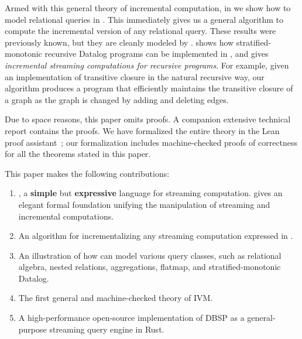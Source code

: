 Armed with this general theory of incremental computation, in
 we show how to model relational queries in
\dbsp.  This immediately gives us a general algorithm to compute the
incremental version of any relational query.  These results were
previously known, but they are cleanly modeled by \dbsp.
 shows how stratified-monotonic recursive Datalog
programs can be implemented in \dbsp, and  gives
\emph{incremental streaming computations for recursive programs}. For
example, given an implementation of transitive closure in the natural
recursive way, our algorithm produces a program that efficiently
maintains the transitive closure of a graph as the graph is changed by
adding and deleting edges.

Due to space reasons, this paper omits proofs.  A companion extensive
technical report contains the proofs.  We have
formalized the entire \dbsp theory in the Lean proof
assistant~; our formalization includes
machine-checked proofs of correctness for all the theorems stated in
this paper.

This paper makes the following contributions:
\begin{enumerate}[nosep, leftmargin=0pt, itemindent=0.5cm, label=\textbf{(\arabic{*})}]
  \item \dbsp, a \textbf{simple} but \textbf{expressive} language for streaming
  computation. \dbsp gives an elegant formal foundation unifying the manipulation of
  streaming and incremental computations.
  \item An algorithm for incrementalizing any streaming computation expressed in
  \dbsp.
  \item An illustration of how \dbsp can model various query classes, such as relational algebra,
  nested relations, aggregations, flatmap, and stratified-monotonic Datalog.
  \item The first general and machine-checked theory of IVM.
  \item A high-performance open-source implementation of DBSP as a
  general-purpose streaming query engine in Rust.
\end{enumerate}
